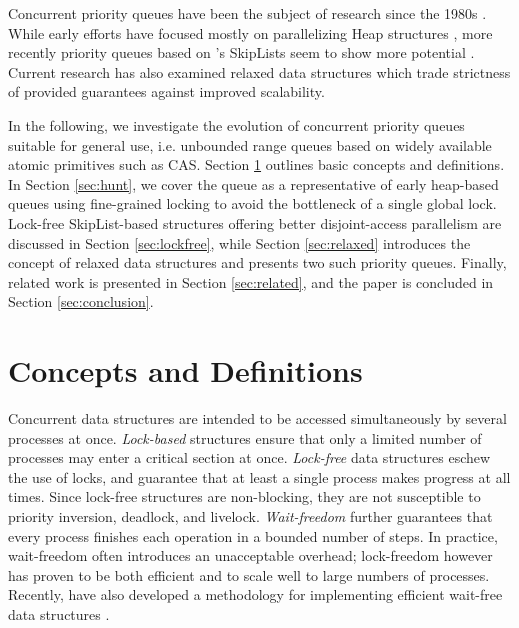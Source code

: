 \documentclass[a4paper,10pt]{article}
\begin{document}
Concurrent priority queues have been the subject of research since the 1980s
\cite{ayani1990lr,biswas1987simultaneous,das1996distributed,deo1992parallel,huang1991evaluation,
luchetti1993some,mans1998portable,olariu1991optimal,prasad1995parallel}.
While early efforts have focused mostly on parallelizing Heap structures
\cite{hunt1996efficient},
more recently priority queues based on \citeauthor{pugh1990skip}'s SkipLists
\cite{pugh1990skip} seem to show more potential \cite{shavit2000skiplist,
sundell2003fast,herlihy2012art,linden2013skiplist}. Current research has also examined
relaxed data structures \cite{wimmer2013data,alistarhspraylist} which trade
strictness of provided guarantees against improved scalability.



In the following, we investigate the evolution of concurrent priority queues suitable for general use,
i.e. unbounded range queues based on widely available atomic primitives such as \ac{CAS}.
Section \ref{sec:concepts} outlines basic concepts and definitions. In Section \ref{sec:hunt},
we cover the \citeauthor{hunt1996efficient} queue as a representative of early heap-based queues using
fine-grained locking to avoid the bottleneck of a single global lock. Lock-free SkipList-based
structures offering better disjoint-access parallelism are discussed in Section \ref{sec:lockfree},
while Section \ref{sec:relaxed} introduces the concept of relaxed data structures and presents two
such priority queues. Finally, related work is presented in Section \ref{sec:related}, and the paper is
concluded in Section \ref{sec:conclusion}.

\section{Concepts and Definitions} \label{sec:concepts}



Concurrent data structures are intended to be accessed simultaneously by several processes
at once. \emph{Lock-based} structures ensure that only a limited number of processes may enter
a critical section at once. \emph{Lock-free} data structures eschew the use of locks, and guarantee
that at least a single process makes progress at all times. Since lock-free structures are
non-blocking, they are not susceptible to priority inversion, deadlock, and livelock.
\emph{Wait-freedom} further guarantees that every process finishes each operation in a bounded number of steps.
In practice, wait-freedom often introduces an unacceptable overhead; lock-freedom
however has proven to be both efficient and to scale well to large numbers of processes.
Recently, \citeauthor{kogan2012methodology} have also developed a methodology for implementing efficient
wait-free data structures \cite{kogan2012methodology}.
\end{document}
